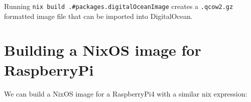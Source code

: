 Running \texttt{nix\ build\ .\#packages.digitalOceanImage} creates a
\texttt{.qcow2.gz} formatted image file that can be imported into
DigitalOcean.

\hypertarget{building-a-nixos-image-for-raspberrypi}{%
\section{Building a NixOS image for
RaspberryPi}\label{building-a-nixos-image-for-raspberrypi}}

We can build a NixOS image for a RaspberryPi4 with a similar nix
expression:

\begin{Shaded}
\begin{Highlighting}[]
\OperatorTok{\{}
   \OperatorTok{=} \OperatorTok{\{}
     \OperatorTok{=} \OperatorTok{;}
  \OperatorTok{\};}

   \OperatorTok{=}\OperatorTok{\{} \OperatorTok{,} \OperatorTok{,}  \OperatorTok{\}}\NormalTok{:}
       \OperatorTok{=} \OperatorTok{(}  \OperatorTok{\{} \OperatorTok{;}  \OperatorTok{=} \OperatorTok{;} \OperatorTok{\});}

       \OperatorTok{=} \OperatorTok{\{}
         \OperatorTok{=} \OperatorTok{;}
      \OperatorTok{\};}
    \OperatorTok{\{}
         \OperatorTok{=} \OperatorTok{(}\OperatorTok{(\{} \OperatorTok{,}  \OperatorTok{\}}\NormalTok{: }\OperatorTok{\{}
             \OperatorTok{=} \OperatorTok{;}
             \OperatorTok{=} \OperatorTok{[}
              \OperatorTok{(}\SpecialCharTok{$\{}\SpecialCharTok{\}}\OperatorTok{)}
            \OperatorTok{];}
            
             \OperatorTok{=} \OperatorTok{[}
            \OperatorTok{];}
        \OperatorTok{\}))}\OperatorTok{;}
    \OperatorTok{\};}
\OperatorTok{\}}
\end{Highlighting}
\end{Shaded}

